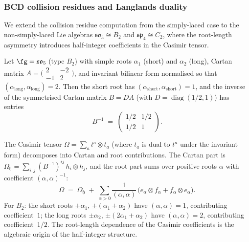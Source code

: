 \subsubsection{BCD collision residues and Langlands duality}
\label{subsubsec:BCD-collision-residues}

We extend the collision residue computation from the simply-laced
case to the non-simply-laced Lie algebras
$\mathfrak{so}_5 \cong B_2$ and $\mathfrak{sp}_4 \cong C_2$,
where the root-length asymmetry introduces half-integer
coefficients in the Casimir tensor.

\begin{computation}
\label{comp:BCD-collision-residues}
Let $\fg = \mathfrak{so}_5$ (type $B_2$) with simple roots
$\alpha_1$ (short) and $\alpha_2$ (long), Cartan matrix
$A = \bigl(\begin{smallmatrix} 2 & -2 \\ -1 & 2 \end{smallmatrix}
\bigr)$,
and invariant bilinear form normalised so that
$(\alpha_{\mathrm{long}}, \alpha_{\mathrm{long}}) = 2$.
Then the short root has
$(\alpha_{\mathrm{short}}, \alpha_{\mathrm{short}}) = 1$,
and the inverse of the symmetrised Cartan matrix
$B = DA$ (with $D = \operatorname{diag}(1/2, 1)$)
has entries
\begin{equation}\label{eq:B2-inverse-cartan}
 B^{-1}
 \;=\;
 \begin{pmatrix} 1/2 & 1/2 \\ 1/2 & 1 \end{pmatrix}.
\end{equation}

The Casimir tensor $\Omega = \sum_{a} t^a \otimes t_a$
(where $t_a$ is dual to $t^a$ under the invariant form) decomposes
into Cartan and root contributions. The Cartan part
is $\Omega_{\mathfrak{h}} = \sum_{i,j} (B^{-1})^{ij}\,
h_i \otimes h_j$, and the root part sums over positive
roots $\alpha$ with coefficient
$(\alpha, \alpha)^{-1}$:
\begin{equation}\label{eq:BCD-casimir-decomposition}
 \Omega
 \;=\;
 \Omega_{\mathfrak{h}}
 \;+\;
 \sum_{\alpha > 0}
 \frac{1}{(\alpha,\alpha)}\,
 \bigl(e_\alpha \otimes f_\alpha + f_\alpha \otimes e_\alpha\bigr).
\end{equation}
For $B_2$: the short roots $\pm\alpha_1$, $\pm(\alpha_1 + \alpha_2)$
have $(\alpha,\alpha) = 1$, contributing coefficient~$1$;
the long roots $\pm\alpha_2$, $\pm(2\alpha_1 + \alpha_2)$
have $(\alpha,\alpha) = 2$, contributing coefficient~$1/2$.
The root-length dependence of the Casimir coefficients
is the algebraic origin of the half-integer structure.


\end{computation}
